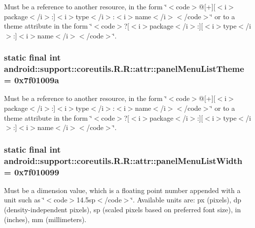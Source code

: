 Must be a reference to another resource, in the form \char`\"{}$<$code$>$@\mbox{[}+\mbox{]}\mbox{[}$<$i$>$package$<$/i$>$:\mbox{]}$<$i$>$type$<$/i$>$:$<$i$>$name$<$/i$>$$<$/code$>$\char`\"{} or to a theme attribute in the form \char`\"{}$<$code$>$?\mbox{[}$<$i$>$package$<$/i$>$:\mbox{]}\mbox{[}$<$i$>$type$<$/i$>$:\mbox{]}$<$i$>$name$<$/i$>$$<$/code$>$\char`\"{}. \hypertarget{classandroid_1_1support_1_1coreutils_1_1_r_1_1attr_6568208926de9029f7926018b85c62db}{
\subsubsection[{panelMenuListTheme}]{\setlength{\rightskip}{0pt plus 5cm}static final int android::support::coreutils.R.R::attr::panelMenuListTheme = 0x7f01009a}}
\label{classandroid_1_1support_1_1coreutils_1_1_r_1_1attr_6568208926de9029f7926018b85c62db}


Must be a reference to another resource, in the form \char`\"{}$<$code$>$@\mbox{[}+\mbox{]}\mbox{[}$<$i$>$package$<$/i$>$:\mbox{]}$<$i$>$type$<$/i$>$:$<$i$>$name$<$/i$>$$<$/code$>$\char`\"{} or to a theme attribute in the form \char`\"{}$<$code$>$?\mbox{[}$<$i$>$package$<$/i$>$:\mbox{]}\mbox{[}$<$i$>$type$<$/i$>$:\mbox{]}$<$i$>$name$<$/i$>$$<$/code$>$\char`\"{}. \hypertarget{classandroid_1_1support_1_1coreutils_1_1_r_1_1attr_e9ebd4e7c1039a9a64b8fe6b950319cd}{
\subsubsection[{panelMenuListWidth}]{\setlength{\rightskip}{0pt plus 5cm}static final int android::support::coreutils.R.R::attr::panelMenuListWidth = 0x7f010099}}
\label{classandroid_1_1support_1_1coreutils_1_1_r_1_1attr_e9ebd4e7c1039a9a64b8fe6b950319cd}


Must be a dimension value, which is a floating point number appended with a unit such as \char`\"{}$<$code$>$14.5sp$<$/code$>$\char`\"{}. Available units are: px (pixels), dp (density-independent pixels), sp (scaled pixels based on preferred font size), in (inches), mm (millimeters). 


